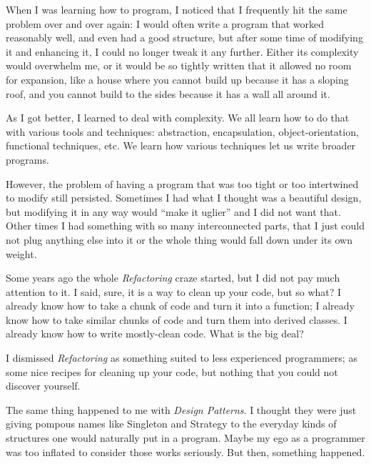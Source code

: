

\noindent{}When I was learning how to program, I noticed that I frequently hit the same
problem over and over again: I would often write a program that worked
reasonably well, and even had a good structure, but after some time of modifying
it and enhancing it, I could no longer tweak it any further. Either its
complexity would overwhelm me, or it would be so tightly written that it allowed
no room for expansion, like a house where you cannot build up because it has a
sloping roof, and you cannot build to the sides because it has a wall all around
it.

As I got better, I learned to deal with complexity. We all learn how to do that
with various tools and techniques: abstraction, encapsulation,
object-orientation, functional techniques, etc. We learn how various techniques
let us write broader programs.

However, the problem of having a program that was too tight or too intertwined
to modify still persisted. Sometimes I had what I thought was a beautiful
design, but modifying it in any way would ``make it uglier'' and I did not want
that. Other times I had something with so many interconnected parts, that I just
could not plug anything else into it or the whole thing would fall down under
its own weight.

Some years ago the whole \textit{Refactoring} craze started, but I did not pay
much attention to it. I said, sure, it is a way to clean up your code, but so
what? I already know how to take a chunk of code and turn it into a function; I
already know how to take similar chunks of code and turn them into derived
classes. I already know how to write mostly-clean code. What is the big deal?

I dismissed \textit{Refactoring} as something suited to less experienced
programmers; as some nice recipes for cleaning up your code, but nothing that
you could not discover yourself.

The same thing happened to me with \textit{Design Patterns}. I thought they were
just giving pompous names like Singleton and Strategy to the everyday kinds of
structures one would naturally put in a program. Maybe my ego as a programmer
was too inflated to consider those works seriously. But then, something
happened.

